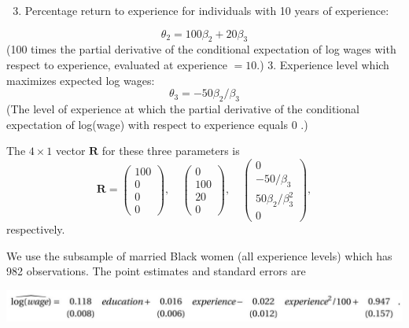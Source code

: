 \documentclass[10pt]{article}
\begin{document}
\begin{enumerate}
  \setcounter{enumi}{2}
  \item Percentage return to experience for individuals with 10 years of experience:
\end{enumerate}
$$
\theta_{2}=100 \beta_{2}+20 \beta_{3}
$$
(100 times the partial derivative of the conditional expectation of log wages with respect to experience, evaluated at experience $=10$.) 3. Experience level which maximizes expected log wages:
$$
\theta_{3}=-50 \beta_{2} / \beta_{3}
$$
(The level of experience at which the partial derivative of the conditional expectation of log(wage) with respect to experience equals 0 .)

The $4 \times 1$ vector $\boldsymbol{R}$ for these three parameters is
$$
\boldsymbol{R}=\left(\begin{array}{c}
100 \\
0 \\
0 \\
0
\end{array}\right), \quad\left(\begin{array}{c}
0 \\
100 \\
20 \\
0
\end{array}\right), \quad\left(\begin{array}{c}
0 \\
-50 / \beta_{3} \\
50 \beta_{2} / \beta_{3}^{2} \\
0
\end{array}\right),
$$
respectively.

We use the subsample of married Black women (all experience levels) which has 982 observations. The point estimates and standard errors are

\includegraphics[max width=\textwidth]{2022_09_17_4fdd33cd9a12f3020189g-17}
\end{document}
